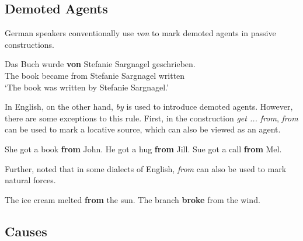 \documentclass[lucida]{sp} %
\begin{document}
\subsection{Demoted Agents}

German speakers conventionally use \textit{von} to mark demoted agents in passive constructions.

\begin{exe}
\ex \label{ex:von-agt-1} \gll Das Buch wurde \textbf{von} Stefanie Sargnagel geschrieben. \\
The book became from Stefanie Sargnagel written \\
`The book was written by Stefanie Sargnagel.' 
\end{exe}
In English, on the other hand,  \textit{by} is used to introduce demoted agents. However, there are some exceptions to this rule. 
First, in the construction \textit{get ... from}, \textit{from} can be used to mark a locative source, which can also be viewed as an agent.
\begin{exe}
\ex She got a book \textbf{from} John.
\ex He got a hug \textbf{from} Jill.
\ex Sue got a call \textbf{from} Mel.
\end{exe} 
Further, \cite{clark1989a} noted that in some dialects of English, \textit{from} can also be used to mark natural forces.
\begin{exe}
\ex The ice cream melted \textbf{from} the sun. \hfill \cite{clark1989a}
\ex The branch \textbf{broke} from the wind. \hfill \cite{clark1989a}
\end{exe} 

\subsection{Causes}
\end{document}
